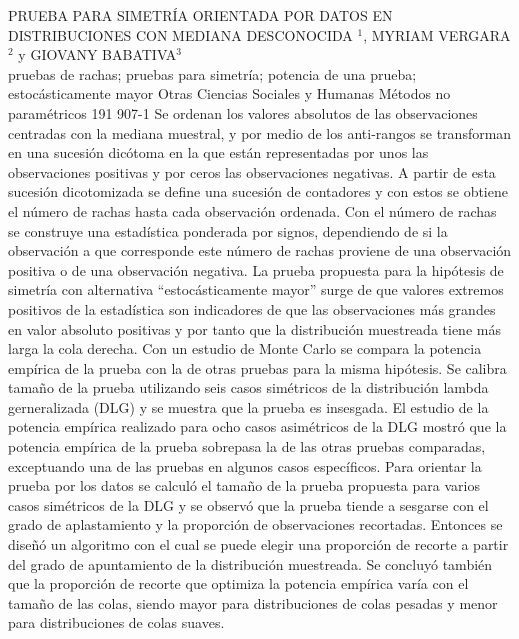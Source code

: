\A
{PRUEBA PARA SIMETRÍA ORIENTADA POR DATOS EN DISTRIBUCIONES CON MEDIANA DESCONOCIDA}
{$^1$, MYRIAM VERGARA$^2$ y GIOVANY BABATIVA$^3$}
{
\\\Email{}}
{pruebas de rachas; pruebas para simetría; potencia de una prueba; estocásticamente mayor} 
 {Otras Ciencias Sociales y Humanas} 
 {Métodos no paramétricos} 
 {191} 
 {907-1}
{Se ordenan los valores absolutos de las observaciones centradas con la mediana muestral, y por medio de los anti-rangos se transforman en una sucesión dicótoma en la que están representadas por unos las observaciones positivas y por ceros las observaciones negativas. A partir de esta sucesión dicotomizada se define una sucesión de contadores y con estos se obtiene el número de rachas hasta cada observación ordenada. Con el número de rachas se construye una estadística ponderada por signos, dependiendo de si la observación a que corresponde este número de rachas proviene de una observación positiva o de una observación negativa. La prueba propuesta para la hipótesis de simetría con alternativa “estocásticamente mayor” surge de que valores extremos positivos de la estadística son indicadores de que las observaciones más grandes en valor absoluto positivas y por tanto que la distribución muestreada tiene más larga la cola derecha. Con un estudio de Monte Carlo se compara la potencia empírica de la prueba con la de otras pruebas para la misma hipótesis. Se calibra tamaño de la prueba utilizando seis casos simétricos de la distribución lambda gerneralizada (DLG) y se muestra que la prueba es insesgada. El estudio de la potencia empírica realizado para ocho casos asimétricos de la DLG mostró que la potencia empírica de la prueba sobrepasa la de las otras pruebas comparadas, exceptuando una de las pruebas en algunos casos específicos. Para orientar la prueba por los datos se calculó el tamaño de la prueba propuesta para varios casos simétricos de la DLG y se observó que la prueba tiende a sesgarse con el grado de aplastamiento y la proporción de observaciones recortadas. Entonces se diseñó un algoritmo con el cual se puede elegir una proporción de recorte a partir del grado de apuntamiento de la distribución muestreada. Se concluyó también que la proporción de recorte que optimiza la potencia empírica varía con el tamaño de las colas, siendo mayor para distribuciones de colas pesadas y menor para distribuciones de colas suaves.}